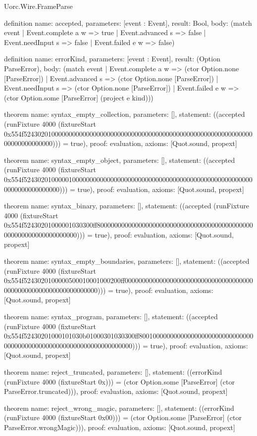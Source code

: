 \begin{lexlean}{Uorc.Wire.FrameParse}
\begin{semanticmodule}
definition{
  name: accepted,
  parameters: [event : Event],
  result: Bool,
  body: (match event
    | Event.complete a w => true
    | Event.advanced s => false
    | Event.needInput s => false
    | Event.failed e w => false)
}

definition{
  name: errorKind,
  parameters: [event : Event],
  result: (Option ParseError),
  body: (match event
    | Event.complete a w => (ctor Option.none [ParseError])
    | Event.advanced s => (ctor Option.none [ParseError])
    | Event.needInput s => (ctor Option.none [ParseError])
    | Event.failed e w => (ctor Option.some [ParseError] (project e kind)))
}

theorem{
  name: syntax_empty_collection,
  parameters: [],
  statement: ((accepted (runFixture 4000 (fixtureStart 0x554f52430201000000000000000000000000000000000000000000000000000000000000000000000000))) = true),
  proof: evaluation{},
  axioms: [Quot.sound, propext]
}

theorem{
  name: syntax_empty_object,
  parameters: [],
  statement: ((accepted (runFixture 4000 (fixtureStart 0x554f5243020100000100000000000000000000000000000000000000000000000000000000000000000000))) = true),
  proof: evaluation{},
  axioms: [Quot.sound, propext]
}

theorem{
  name: syntax_binary,
  parameters: [],
  statement: ((accepted (runFixture 4000 (fixtureStart 0x554f52430201000001030300ff800000000000000000000000000000000000000000000000000000000000000000))) = true),
  proof: evaluation{},
  axioms: [Quot.sound, propext]
}

theorem{
  name: syntax_empty_boundaries,
  parameters: [],
  statement: ((accepted (runFixture 4000 (fixtureStart 0x554f5243020100000500010001000200ff0000000000000000000000000000000000000000000000000000000000000000))) = true),
  proof: evaluation{},
  axioms: [Quot.sound, propext]
}

theorem{
  name: syntax_program,
  parameters: [],
  statement: ((accepted (runFixture 4000 (fixtureStart 0x554f52430201000101030b01000301030300ff8001000000000000000000000000000000000000000000000000000000000000000000))) = true),
  proof: evaluation{},
  axioms: [Quot.sound, propext]
}

theorem{
  name: reject_truncated,
  parameters: [],
  statement: ((errorKind (runFixture 4000 (fixtureStart 0x))) = (ctor Option.some [ParseError] (ctor ParseError.truncated))),
  proof: evaluation{},
  axioms: [Quot.sound, propext]
}

theorem{
  name: reject_wrong_magic,
  parameters: [],
  statement: ((errorKind (runFixture 4000 (fixtureStart 0x00))) = (ctor Option.some [ParseError] (ctor ParseError.wrongMagic))),
  proof: evaluation{},
  axioms: [Quot.sound, propext]
}


\end{semanticmodule}
\end{lexlean}
